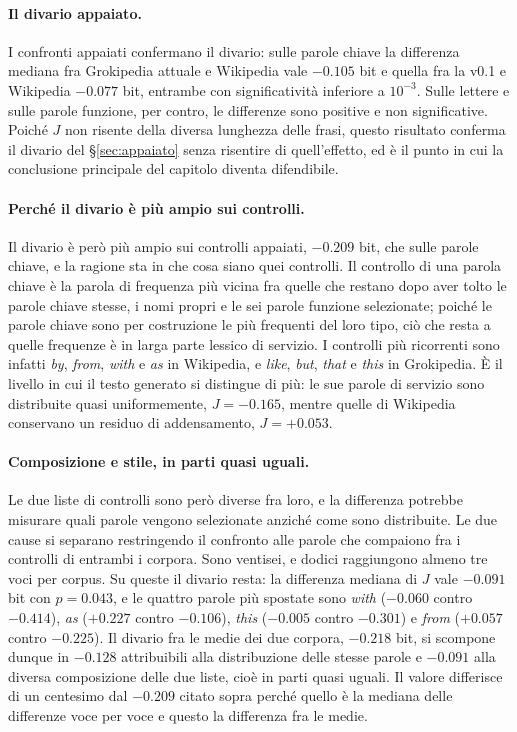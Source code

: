 \paragraph{Il divario appaiato.}
I confronti appaiati confermano il divario: sulle parole chiave la differenza
mediana fra Grokipedia attuale e Wikipedia vale $-0.105$ bit e quella fra la
v0.1 e Wikipedia $-0.077$ bit, entrambe con significatività inferiore a
$10^{-3}$. Sulle lettere e sulle parole funzione, per contro, le differenze sono
positive e non significative. Poiché $J$ non risente della diversa lunghezza
delle frasi, questo risultato conferma il divario del §\ref{sec:appaiato}
senza risentire di quell'effetto, ed è il punto in cui la conclusione principale
del capitolo diventa difendibile.

\paragraph{Perché il divario è più ampio sui controlli.}
Il divario è però più ampio sui controlli appaiati, $-0.209$ bit, che sulle
parole chiave, e la ragione sta in che cosa siano quei controlli. Il controllo
di una parola chiave è la parola di frequenza più vicina fra quelle che restano
dopo aver tolto le parole chiave stesse, i nomi propri e le sei parole funzione
selezionate; poiché le parole chiave sono per costruzione le più frequenti del
loro tipo, ciò che resta a quelle frequenze è in larga parte lessico di
servizio. I controlli più ricorrenti sono infatti \emph{by}, \emph{from},
\emph{with} e \emph{as} in Wikipedia, e \emph{like}, \emph{but}, \emph{that} e
\emph{this} in Grokipedia. È il livello in cui il testo generato si distingue di
più: le sue parole di servizio sono distribuite quasi uniformemente,
$J = -0.165$, mentre quelle di Wikipedia conservano un residuo di
addensamento, $J = +0.053$.

\paragraph{Composizione e stile, in parti quasi uguali.}
Le due liste di controlli sono però diverse fra loro, e la differenza potrebbe
misurare quali parole vengono selezionate anziché come sono distribuite. Le due
cause si separano restringendo il confronto alle parole che compaiono fra i
controlli di entrambi i corpora. Sono ventisei, e dodici raggiungono almeno tre
voci per corpus. Su queste il divario resta: la differenza mediana di $J$ vale
$-0.091$ bit con $p = 0.043$, e le quattro parole più spostate sono
\emph{with} ($-0.060$ contro $-0.414$), \emph{as} ($+0.227$ contro $-0.106$),
\emph{this} ($-0.005$ contro $-0.301$) e \emph{from} ($+0.057$ contro $-0.225$).
Il divario fra le medie dei due corpora, $-0.218$ bit, si scompone dunque in
$-0.128$ attribuibili alla distribuzione delle stesse parole e $-0.091$ alla
diversa composizione delle due liste, cioè in parti quasi uguali. Il valore
differisce di un centesimo dal $-0.209$ citato sopra perché quello è la mediana
delle differenze voce per voce e questo la differenza fra le medie.

